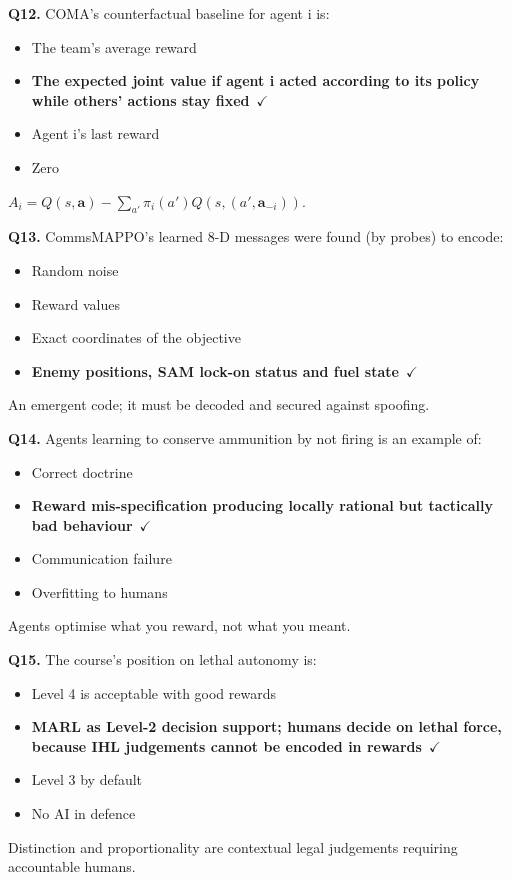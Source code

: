 \documentclass[11pt]{article}
\begin{document}
{\noindent\textbf{Q12.} COMA's counterfactual baseline for agent i is:\begin{itemize}[leftmargin=2.2em,itemsep=0pt,topsep=1pt]\item[A.] The team's average reward\item[\textbf{B.}] \textbf{The expected joint value if agent i acted according to its policy while others' actions stay fixed}~{\color{GrnN}$\checkmark$}\item[C.] Agent i's last reward\item[D.] Zero\end{itemize} $A_i=Q(s,\mathbf a)-\sum_{a'}\pi_i(a')Q(s,(a',\mathbf a_{-i}))$.\par\medskip

\noindent\textbf{Q13.} CommsMAPPO's learned 8-D messages were found (by probes) to encode:\begin{itemize}[leftmargin=2.2em,itemsep=0pt,topsep=1pt]\item[A.] Random noise\item[B.] Reward values\item[C.] Exact coordinates of the objective\item[\textbf{D.}] \textbf{Enemy positions, SAM lock-on status and fuel state}~{\color{GrnN}$\checkmark$}\end{itemize} An emergent code; it must be decoded and secured against spoofing.\par\medskip

\noindent\textbf{Q14.} Agents learning to conserve ammunition by not firing is an example of:\begin{itemize}[leftmargin=2.2em,itemsep=0pt,topsep=1pt]\item[A.] Correct doctrine\item[\textbf{B.}] \textbf{Reward mis-specification producing locally rational but tactically bad behaviour}~{\color{GrnN}$\checkmark$}\item[C.] Communication failure\item[D.] Overfitting to humans\end{itemize} Agents optimise what you reward, not what you meant.\par\medskip

\noindent\textbf{Q15.} The course's position on lethal autonomy is:\begin{itemize}[leftmargin=2.2em,itemsep=0pt,topsep=1pt]\item[A.] Level 4 is acceptable with good rewards\item[\textbf{B.}] \textbf{MARL as Level-2 decision support; humans decide on lethal force, because IHL judgements cannot be encoded in rewards}~{\color{GrnN}$\checkmark$}\item[C.] Level 3 by default\item[D.] No AI in defence\end{itemize} Distinction and proportionality are contextual legal judgements requiring accountable humans.\par\medskip

}
\end{document}
